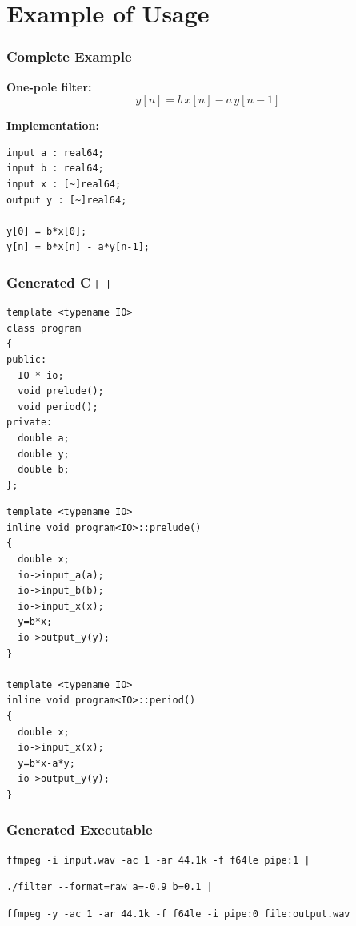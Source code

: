 \documentclass{beamer}
\begin{document}
\section{Example of Usage}

\begin{frame}[fragile]
\frametitle{Complete Example}

\textbf{One-pole filter\footnotemark:}
\[y[n] = b\,x[n] - a\,y[n-1]\]

\textbf{Implementation:}

\vspace{5pt}
\centering

\begin{BVerbatim}
input a : real64;
input b : real64;
input x : [~]real64;
output y : [~]real64;

y[0] = b*x[0];
y[n] = b*x[n] - a*y[n-1];
\end{BVerbatim}


\end{frame}


\begin{frame}[fragile]
\frametitle{Generated C++}

\footnotesize
\begin{minipage}{0.49\linewidth}
\begin{BVerbatim}
template <typename IO>
class program
{
public:
  IO * io;
  void prelude();
  void period();
private:
  double a;
  double y;
  double b;
};
\end{BVerbatim}
\end{minipage}\hfill
\begin{minipage}{0.49\linewidth}
\begin{BVerbatim}
template <typename IO>
inline void program<IO>::prelude()
{
  double x;
  io->input_a(a);
  io->input_b(b);
  io->input_x(x);
  y=b*x;
  io->output_y(y);
}

template <typename IO>
inline void program<IO>::period()
{
  double x;
  io->input_x(x);
  y=b*x-a*y;
  io->output_y(y);
}
\end{BVerbatim}
\end{minipage}

\end{frame}


\begin{frame}[fragile]
\frametitle{Generated Executable}

\small

\begin{Verbatim}
ffmpeg -i input.wav -ac 1 -ar 44.1k -f f64le pipe:1 |
\end{Verbatim}

{
\bf
\begin{Verbatim}
./filter --format=raw a=-0.9 b=0.1 |
\end{Verbatim}
}

\begin{Verbatim}
ffmpeg -y -ac 1 -ar 44.1k -f f64le -i pipe:0 file:output.wav
\end{Verbatim}

\end{frame}
\end{document}
